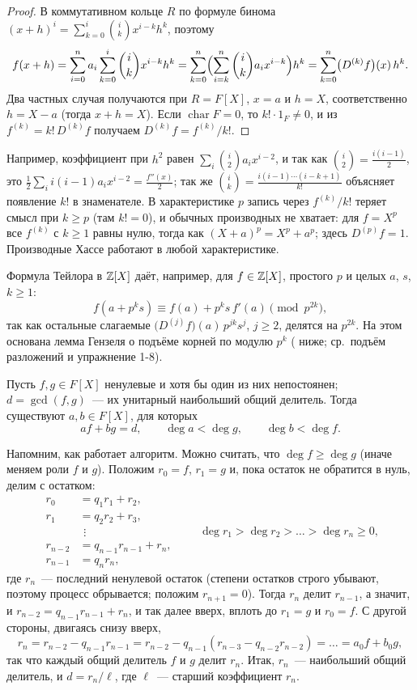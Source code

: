 \begin{proof}
В коммутативном кольце $R$ по формуле бинома $(x+h)^i=\sum_{k=0}^i\binom ikx^{i-k}h^k$, поэтому
\[
f(x+h)=\sum_{i=0}^na_i\sum_{k=0}^i\binom ikx^{i-k}h^k=\sum_{k=0}^n\Bigl(\sum_{i=k}^n\binom ika_ix^{i-k}\Bigr)h^k
=\sum_{k=0}^n\bigl(D^{(k)}f\bigr)(x)\,h^k .
\]
Два частных случая получаются при $R=F[X]$, $x=a$ и $h=X$, соответственно $h=X-a$ (тогда $x+h=X$). Если
$\operatorname{char}F=0$, то $k!\cdot1_F\ne0$, и из $f^{(k)}=k!\,D^{(k)}f$ получаем $D^{(k)}f=f^{(k)}/k!$.
\end{proof}

Например, коэффициент при $h^2$ равен $\sum_i\binom i2a_ix^{i-2}$, и так как $\binom i2=\frac{i(i-1)}2$, это
$\frac12\sum_ii(i-1)a_ix^{i-2}=\frac{f''(x)}{2}$; так же $\binom ik=\frac{i(i-1)\cdots(i-k+1)}{k!}$ объясняет
появление $k!$ в знаменателе. В характеристике $p$ запись через $f^{(k)}/k!$ теряет смысл при $k\ge p$ (там $k!=0$),
и обычных производных не хватает: для $f=X^p$ все $f^{(k)}$ с $k\ge1$ равны нулю, тогда как $(X+a)^p=X^p+a^p$; здесь
$D^{(p)}f=1$. Производные Хассе работают в любой характеристике.

Формула Тейлора в $\mathbb Z[X]$ даёт, например, для $f\in\mathbb Z[X]$, простого $p$ и целых $a$, $s$, $k\ge1$:
\[
f(a+p^ks)\equiv f(a)+p^ks\,f'(a)\pmod{p^{2k}},
\]
так как остальные слагаемые $\bigl(D^{(j)}f\bigr)(a)\,p^{jk}s^j$, $j\ge2$, делятся на $p^{2k}$. На этом основана лемма
Гензеля о подъёме корней по модулю $p^k$ ( ниже; ср.\ подъём разложений  и упражнение 1-8).

\begin{theorem}
Пусть $f,g\in F[X]$ ненулевые и хотя бы один из них непостоянен; $d=\gcd(f,g)$~--- их унитарный наибольший общий
делитель. Тогда существуют $a,b\in F[X]$, для которых
\[
a f+b g=d,\qquad \deg a<\deg g,\qquad \deg b<\deg f.
\]
\end{theorem}

Напомним, как работает алгоритм. Можно считать, что $\deg f\ge\deg g$ (иначе меняем роли $f$ и $g$). Положим
$r_0=f$, $r_1=g$ и, пока остаток не обратится в нуль, делим с остатком:
\[
\begin{aligned}
r_0&=q_1r_1+r_2,\\
r_1&=q_2r_2+r_3,\\
&\ \,\vdots\\
r_{n-2}&=q_{n-1}r_{n-1}+r_n,\\
r_{n-1}&=q_nr_n,
\end{aligned}
\qquad \deg r_1>\deg r_2>\dots>\deg r_n\ge0,
\]
где $r_n$~--- последний ненулевой остаток (степени остатков строго убывают, поэтому процесс обрывается; положим
$r_{n+1}=0$). Тогда $r_n$ делит $r_{n-1}$, а значит, и $r_{n-2}=q_{n-1}r_{n-1}+r_n$, и так далее вверх, вплоть до $r_1=g$ и
$r_0=f$.
С другой стороны, двигаясь снизу вверх,
\[
r_n=r_{n-2}-q_{n-1}r_{n-1}=r_{n-2}-q_{n-1}(r_{n-3}-q_{n-2}r_{n-2})=\dots=a_0f+b_0g,
\]
так что каждый общий делитель $f$ и $g$ делит $r_n$. Итак, $r_n$~--- наибольший общий делитель, и
$d=r_n/\ell$, где $\ell$~--- старший коэффициент $r_n$.


